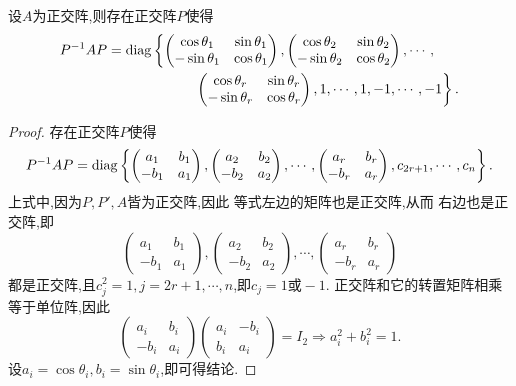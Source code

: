 \begin{deduction}\label{ddn:Real-normal-matrix1}
  设$A$为正交阵,则存在正交阵$P$使得
  \begin{align}
    P^{-1}AP=\operatorname{diag} & \left\{
     \begin{pmatrix}
      \cos\theta_1&\sin\theta_1\\
      -\sin\theta_1&\cos\theta_1
    \end{pmatrix},
    \begin{pmatrix}
      \cos\theta_2&\sin\theta_2\\
      -\sin\theta_2&\cos\theta_2
    \end{pmatrix},\cdots,\right.\notag\\
    & \quad\qquad\left.\begin{pmatrix}
      \cos\theta_r&\sin\theta_r\\
      -\sin\theta_r&\cos\theta_r
    \end{pmatrix},
    1,\cdots,1,-1,\cdots,-1
    \right\}.\label{eq:Real-normal-matrix6}
  \end{align}
\end{deduction}

\begin{proof}
  存在正交阵$P$使得
  \[
    P^{-1}AP=\operatorname{diag}\left\{
    \begin{pmatrix}
      a_1&b_1\\
      -b_1&a_1
    \end{pmatrix},
    \begin{pmatrix}
      a_2&b_2\\
      -b_2&a_2
    \end{pmatrix},\cdots,
    \begin{pmatrix}
      a_r&b_r\\
      -b_r&a_r
    \end{pmatrix},
    c_{2r+1},\cdots,c_n
  \right\}.
\]
上式中,因为$P,P',A$皆为正交阵,因此
等式左边的矩阵也是正交阵,从而
右边也是正交阵,即
\[
  \begin{pmatrix}
    a_1&b_1\\
    -b_1&a_1
  \end{pmatrix},
  \begin{pmatrix}
    a_2&b_2\\
    -b_2&a_2
  \end{pmatrix},\cdots,
  \begin{pmatrix}
    a_r&b_r\\
    -b_r&a_r
  \end{pmatrix}
\]
都是正交阵,且$c_j^2=1,j=2r+1,\cdots,n$,即$c_j=1\text{或}-1$.
正交阵和它的转置矩阵相乘等于单位阵,因此
\[
  \begin{pmatrix}
    a_i&b_i\\
    -b_i&a_i
  \end{pmatrix}
  \begin{pmatrix}
    a_i&-b_i\\
    b_i&a_i
  \end{pmatrix}=I_2\Longrightarrow a_i^2+b_i^2=1.
\]
设$a_i=\cos\theta_i, b_i=\sin\theta_i$,即可得结论.
\end{proof}

